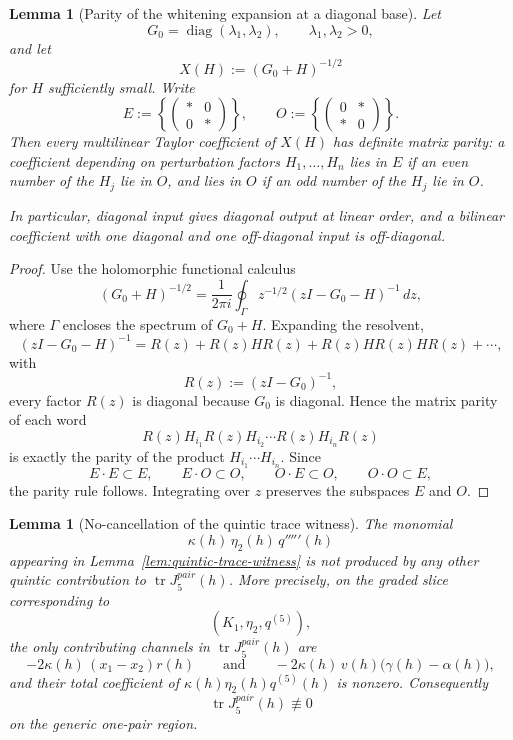 \documentclass[11pt,a4paper]{amsart}
\def\pair{pair}%
\theoremstyle{plain}
\newtheorem{lemma}[theorem]{Lemma}
\theoremstyle{definition}
\newcommand{\pair}{\mathrm{pair}}
\newcommand{\diag}{\operatorname{diag}}
\begin{document}
\begin{lemma}[Parity of the whitening expansion at a diagonal base]
\label{lem:whitening-parity}
Let
\[
G_0=\diag(\lambda_1,\lambda_2),
\qquad \lambda_1,\lambda_2>0,
\]
and let
\[
X(H):=(G_0+H)^{-1/2}
\]
for $H$ sufficiently small. Write
\[
E:=\left\{
\begin{pmatrix}
*&0\\0&*
\end{pmatrix}
\right\},
\qquad
O:=\left\{
\begin{pmatrix}
0&*\\ *&0
\end{pmatrix}
\right\}.
\]
Then every multilinear Taylor coefficient of $X(H)$ has definite matrix
parity: a coefficient depending on perturbation factors
$H_1,\dots,H_n$ lies in $E$ if an even number of the $H_j$ lie in
$O$, and lies in $O$ if an odd number of the $H_j$ lie in $O$.

In particular, diagonal input gives diagonal output at linear order, and a
bilinear coefficient with one diagonal and one off-diagonal input is
off-diagonal.
\end{lemma}

\begin{proof}
Use the holomorphic functional calculus
\[
(G_0+H)^{-1/2}
=
\frac{1}{2\pi i}\oint_{\Gamma} z^{-1/2}(zI-G_0-H)^{-1}\,dz,
\]
where $\Gamma$ encloses the spectrum of $G_0+H$. Expanding the resolvent,
\[
(zI-G_0-H)^{-1}
=
R(z)+R(z)HR(z)+R(z)HR(z)HR(z)+\cdots,
\]
with
\[
R(z):=(zI-G_0)^{-1},
\]
every factor $R(z)$ is diagonal because $G_0$ is diagonal. Hence the
matrix parity of each word
\[
R(z)H_{i_1}R(z)H_{i_2}\cdots R(z)H_{i_n}R(z)
\]
is exactly the parity of the product $H_{i_1}\cdots H_{i_n}$. Since
\[
E\cdot E\subset E,\qquad
E\cdot O\subset O,\qquad
O\cdot E\subset O,\qquad
O\cdot O\subset E,
\]
the parity rule follows. Integrating over $z$ preserves the subspaces
$E$ and $O$.
\end{proof}

\begin{lemma}[No-cancellation of the quintic trace witness]
\label{lem:no-cancellation-quintic-trace}
The monomial
\[
\kappa(h)\,\eta_2(h)\,q'''''\!(h)
\]
appearing in Lemma~\ref{lem:quintic-trace-witness} is not produced by any
other quintic contribution to $\operatorname{tr}J_5^{\pair}(h)$. More
precisely, on the graded slice corresponding to
\[
(K_1,\eta_2,q^{(5)}),
\]
the only contributing channels in
$\operatorname{tr}J_5^{\pair}(h)$ are
\[
-2\kappa(h)\,(x_1-x_2)r(h)
\qquad\text{and}\qquad
-2\kappa(h)\,v(h)\bigl(\gamma(h)-\alpha(h)\bigr),
\]
and their total coefficient of
$\kappa(h)\eta_2(h)q^{(5)}(h)$ is nonzero. Consequently
\[
\operatorname{tr}J_5^{\pair}(h)\not\equiv 0
\]
on the generic one-pair region.
\end{lemma}
\end{document}
